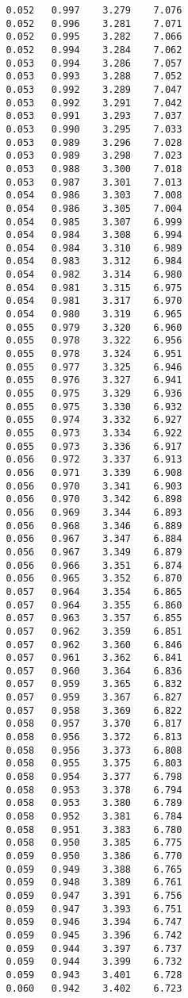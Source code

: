 \begin{verbatim}
   0.052   0.997    3.279    7.076
   0.052   0.996    3.281    7.071
   0.052   0.995    3.282    7.066
   0.052   0.994    3.284    7.062
   0.053   0.994    3.286    7.057
   0.053   0.993    3.288    7.052
   0.053   0.992    3.289    7.047
   0.053   0.992    3.291    7.042
   0.053   0.991    3.293    7.037
   0.053   0.990    3.295    7.033
   0.053   0.989    3.296    7.028
   0.053   0.989    3.298    7.023
   0.053   0.988    3.300    7.018
   0.053   0.987    3.301    7.013
   0.054   0.986    3.303    7.008
   0.054   0.986    3.305    7.004
   0.054   0.985    3.307    6.999
   0.054   0.984    3.308    6.994
   0.054   0.984    3.310    6.989
   0.054   0.983    3.312    6.984
   0.054   0.982    3.314    6.980
   0.054   0.981    3.315    6.975
   0.054   0.981    3.317    6.970
   0.054   0.980    3.319    6.965
   0.055   0.979    3.320    6.960
   0.055   0.978    3.322    6.956
   0.055   0.978    3.324    6.951
   0.055   0.977    3.325    6.946
   0.055   0.976    3.327    6.941
   0.055   0.975    3.329    6.936
   0.055   0.975    3.330    6.932
   0.055   0.974    3.332    6.927
   0.055   0.973    3.334    6.922
   0.055   0.973    3.336    6.917
   0.056   0.972    3.337    6.913
   0.056   0.971    3.339    6.908
   0.056   0.970    3.341    6.903
   0.056   0.970    3.342    6.898
   0.056   0.969    3.344    6.893
   0.056   0.968    3.346    6.889
   0.056   0.967    3.347    6.884
   0.056   0.967    3.349    6.879
   0.056   0.966    3.351    6.874
   0.056   0.965    3.352    6.870
   0.057   0.964    3.354    6.865
   0.057   0.964    3.355    6.860
   0.057   0.963    3.357    6.855
   0.057   0.962    3.359    6.851
   0.057   0.962    3.360    6.846
   0.057   0.961    3.362    6.841
   0.057   0.960    3.364    6.836
   0.057   0.959    3.365    6.832
   0.057   0.959    3.367    6.827
   0.057   0.958    3.369    6.822
   0.058   0.957    3.370    6.817
   0.058   0.956    3.372    6.813
   0.058   0.956    3.373    6.808
   0.058   0.955    3.375    6.803
   0.058   0.954    3.377    6.798
   0.058   0.953    3.378    6.794
   0.058   0.953    3.380    6.789
   0.058   0.952    3.381    6.784
   0.058   0.951    3.383    6.780
   0.058   0.950    3.385    6.775
   0.059   0.950    3.386    6.770
   0.059   0.949    3.388    6.765
   0.059   0.948    3.389    6.761
   0.059   0.947    3.391    6.756
   0.059   0.947    3.393    6.751
   0.059   0.946    3.394    6.747
   0.059   0.945    3.396    6.742
   0.059   0.944    3.397    6.737
   0.059   0.944    3.399    6.732
   0.059   0.943    3.401    6.728
   0.060   0.942    3.402    6.723

\end{verbatim}
